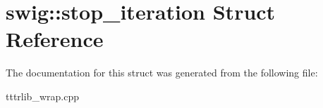\hypertarget{structswig_1_1stop__iteration}{}\section{swig\+:\+:stop\+\_\+iteration Struct Reference}
\label{structswig_1_1stop__iteration}


The documentation for this struct was generated from the following file\+:\begin{DoxyCompactItemize}
\item 
tttrlib\+\_\+wrap.\+cpp\end{DoxyCompactItemize}
